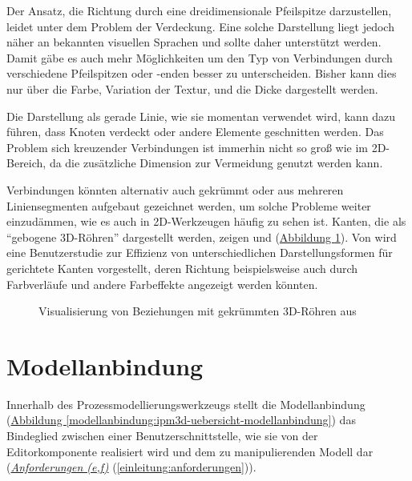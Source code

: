 \documentclass[a4paper,10pt]{sphinxmanual}
\begin{document}
Der Ansatz, die Richtung durch eine dreidimensionale Pfeilspitze darzustellen, leidet unter dem Problem der Verdeckung.
Eine solche Darstellung liegt jedoch näher an bekannten visuellen Sprachen und sollte daher unterstützt werden.
Damit gäbe es auch mehr Möglichkeiten um den Typ von Verbindungen durch verschiedene Pfeilspitzen oder -enden besser zu unterscheiden.
Bisher kann dies nur über die Farbe, Variation der Textur, und die Dicke dargestellt werden.

Die Darstellung als gerade Linie, wie sie momentan verwendet wird, kann dazu führen, dass Knoten verdeckt oder andere Elemente geschnitten werden.
Das Problem sich kreuzender Verbindungen ist immerhin nicht so groß wie im 2D-Bereich, da die zusätzliche Dimension zur Vermeidung genutzt werden kann.

Verbindungen könnten alternativ auch gekrümmt oder aus mehreren Liniensegmenten aufgebaut gezeichnet werden, um solche Probleme weiter einzudämmen, wie es auch in 2D-Werkzeugen häufig zu sehen ist.
Kanten, die als "`gebogene 3D-Röhren"' dargestellt werden, zeigen \cite{spratt_using_1994} und \cite{balzer_hierarchy_2004} (\hyperref[visualisierung:balzert-tubes]{Abbildung  \ref*{visualisierung:balzert-tubes}}).
Von \cite{holten_user_2009} wird eine Benutzerstudie zur Effizienz von unterschiedlichen Darstellungsformen für gerichtete Kanten vorgestellt, deren Richtung beispielsweise auch durch Farbverläufe und andere Farbeffekte angezeigt werden könnten.
\begin{figure}[htbp]
\centering
\capstart

\caption{Visualisierung von Beziehungen mit gekrümmten 3D-Röhren aus \cite{balzer_hierarchy_2004}}\label{visualisierung:balzert-tubes}\end{figure}


\chapter{Modellanbindung}
\label{modellanbindung:modellanbindung}\label{modellanbindung::doc}\label{modellanbindung:id1}
Innerhalb des Prozessmodellierungswerkzeugs stellt die Modellanbindung (\hyperref[modellanbindung:ipm3d-uebersicht-modellanbindung]{Abbildung  \ref*{modellanbindung:ipm3d-uebersicht-modellanbindung}}) das Bindeglied zwischen einer Benutzerschnittstelle, wie sie von der Editorkomponente \cite{uli} realisiert wird und dem zu manipulierenden Modell dar ({\hyperref[einleitung:anforderungen]{\emph{Anforderungen (e,f)}}} (\autoref*{einleitung:anforderungen})).
\end{document}
